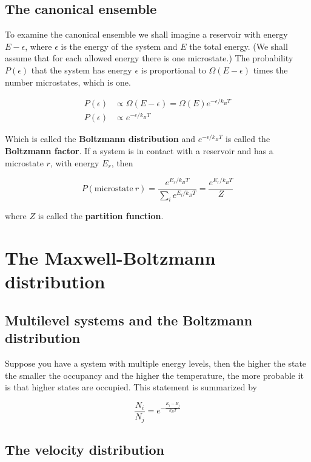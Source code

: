 \documentclass[a4paper]{article}
\begin{document}
\subsection{The canonical ensemble}

To examine the canonical ensemble we shall imagine a reservoir with energy $E-\epsilon$, where $\epsilon$ is the energy of the system and $E$ the total energy. (We shall assume that for each allowed energy there is one microstate.) The probability $P(\epsilon)$ that the system has energy $\epsilon$ is proportional to $\Omega(E-\epsilon)$ times the number microstates, which is one.


\begin{align}
	P(\epsilon)&\propto \Omega(E-\epsilon)=\Omega(E) e^{-\epsilon/k_BT}\\[1em]
    P(\epsilon)&\propto e^{-\epsilon/k_BT}
\end{align}

Which is called the \textbf{Boltzmann distribution} and $e^{-\epsilon/k_BT}$ is called the \textbf{Boltzmann factor}. If a system is in contact with a reservoir and has a microstate $r$, with energy $E_r$, then

\begin{equation}
	P(\text{microstate}\ r)=\frac{e^{E_r/k_BT}}{\sum_i e^{E_i/k_BT}}=\frac{e^{E_r/k_BT}}{Z}
\end{equation}

where $Z$ is called the \textbf{partition function}.

\section{The Maxwell-Boltzmann distribution}

\subsection{Multilevel systems and the Boltzmann distribution}

Suppose you have a system with multiple energy levels, then the higher the state the smaller the occupancy and the higher the temperature, the more probable it is that higher states are occupied. This statement is summarized by

\begin{equation}
	\frac{N_i}{N_j}=e^{-\frac{E_i-E_j}{k_BT}}
\end{equation}

\subsection{The velocity distribution}
\end{document}
